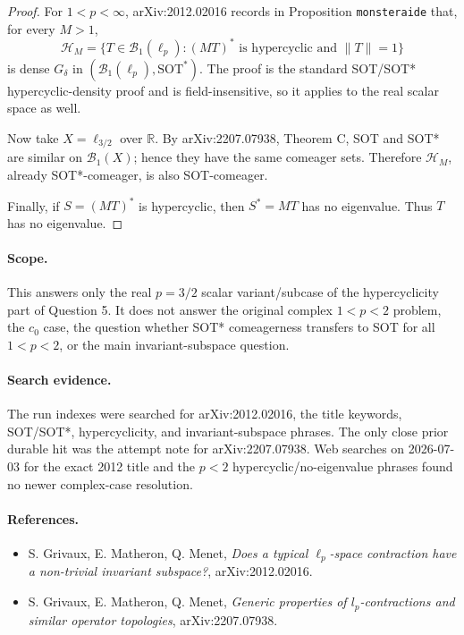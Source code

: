 \documentclass[11pt]{article}
\begin{document}
\begin{proof}
For \(1<p<\infty\), arXiv:2012.02016 records in Proposition \texttt{monsteraide} that, for every \(M>1\),
\[
\mathcal H_M=\{T\in\mathcal B_1(\ell_p): (MT)^*\text{ is hypercyclic and }\|T\|=1\}
\]
is dense \(G_\delta\) in \((\mathcal B_1(\ell_p),\mathrm{SOT}^*)\). The proof is the standard SOT/SOT* hypercyclic-density proof and is field-insensitive, so it applies to the real scalar space as well.

Now take \(X=\ell_{3/2}\) over \(\mathbb R\). By arXiv:2207.07938, Theorem C, SOT and SOT* are similar on \(\mathcal B_1(X)\); hence they have the same comeager sets. Therefore \(\mathcal H_M\), already SOT*-comeager, is also SOT-comeager.

Finally, if \(S=(MT)^*\) is hypercyclic, then \(S^*=MT\) has no eigenvalue. Thus \(T\) has no eigenvalue.
\end{proof}

\paragraph{Scope.}
This answers only the real \(p=3/2\) scalar variant/subcase of the hypercyclicity part of Question 5. It does not answer the original complex \(1<p<2\) problem, the \(c_0\) case, the question whether SOT* comeagerness transfers to SOT for all \(1<p<2\), or the main invariant-subspace question.

\paragraph{Search evidence.}
The run indexes were searched for arXiv:2012.02016, the title keywords, SOT/SOT*, hypercyclicity, and invariant-subspace phrases. The only close prior durable hit was the attempt note for arXiv:2207.07938. Web searches on 2026-07-03 for the exact 2012 title and the \(p<2\) hypercyclic/no-eigenvalue phrases found no newer complex-case resolution.

\paragraph{References.}
\begin{itemize}
\item S. Grivaux, E. Matheron, Q. Menet, \emph{Does a typical \(\ell_p\)-space contraction have a non-trivial invariant subspace?}, arXiv:2012.02016.
\item S. Grivaux, E. Matheron, Q. Menet, \emph{Generic properties of \(l_p\)-contractions and similar operator topologies}, arXiv:2207.07938.
\end{itemize}
\end{document}

